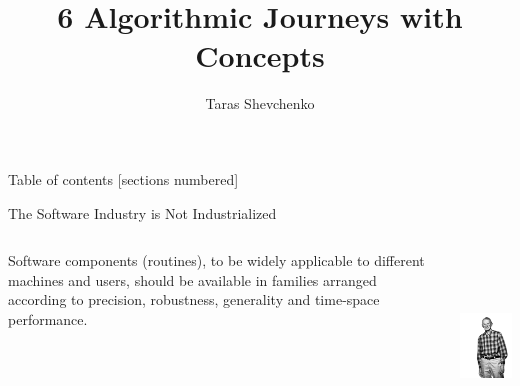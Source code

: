 \documentclass[10pt]{beamer}
\title{6 Algorithmic Journeys with Concepts}
\date{}
\author{Taras Shevchenko}
\institute{Rails Reactor / Giphy}
\begin{document}
\maketitle

\begin{frame}{Table of contents}
  [sections numbered]
  \tableofcontents[hideallsubsections]
\end{frame}


\begin{frame}{The Software Industry is Not Industrialized}
    \begin{columns}
        \begin{column}{0.6\textwidth}
			Software components (routines), to be widely applicable to
			different machines and users, should be available in families arranged
			according to precision, robustness, generality and time-space performance.
        \end{column}
        \begin{column}{0.4\textwidth}  %
                \begin{center}
					\includegraphics[height=5cm]{images/doug_mcilroy.jpg}
                \end{center}
        \end{column}
    \end{columns}
\end{frame}
\end{document}

